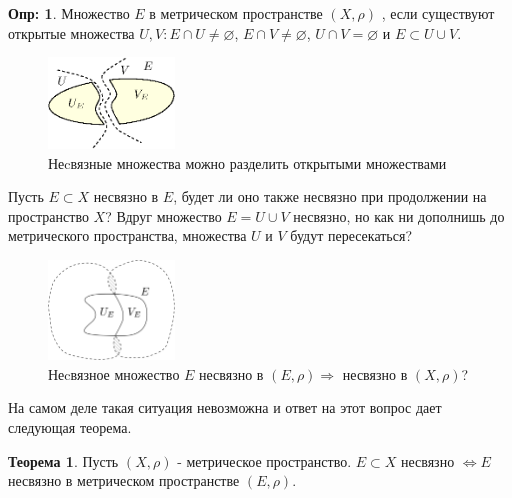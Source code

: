 \documentclass[12pt]{article}
\newcommand{\VN}{\varnothing}
\theoremstyle{definition}
\newtheorem{defn}{Опр:}
\newtheorem{theorem}{Теорема}
\begin{document}
\begin{defn}
	Множество $E$ в метрическом пространстве $(X,\rho)$ , если существуют открытые множества $U,V \colon E \cap U \neq \VN$, $E \cap V \neq \VN$, $U \cap V = \VN$ и $E \subset U \cup V$.
\end{defn}
\begin{figure}[H]
	\centering
	\includegraphics[width=0.3\textwidth]{10_6.eps}
	\caption{Неcвязные множества можно разделить открытыми множествами}
	\label{10_6}
\end{figure}
Пусть $E \subset X$ несвязно в $E$, будет ли оно также несвязно при продолжении на пространство $X$? Вдруг множество $E = U \cup V$ несвязно, но как ни дополнишь до метрического пространства, множества $U$ и $V$ будут пересекаться?
 
\begin{figure}[H]
	\centering
	\includegraphics[width=0.3\textwidth]{10_7.png}
	\caption{Неcвязное множество $E$ несвязно в $(E,\rho) \Rightarrow$ несвязно в $(X,\rho)$?}
	\label{10_7}
\end{figure}

На самом деле такая ситуация невозможна и ответ на этот вопрос дает следующая теорема.

\begin{theorem}
	Пусть $(X,\rho)$ - метрическое пространство. $E \subset X$ несвязно $\Leftrightarrow E$  несвязно в метрическом пространстве $(E,\rho)$.
\end{theorem}
\end{document}
